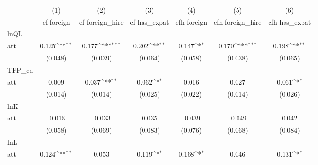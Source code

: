 {
\def\sym#1{\ifmmode^{#1}\else\(^{#1}\)\fi}
\begin{tabular}{l*{6}{c}}
\hline\hline
            &\multicolumn{1}{c}{(1)}&\multicolumn{1}{c}{(2)}&\multicolumn{1}{c}{(3)}&\multicolumn{1}{c}{(4)}&\multicolumn{1}{c}{(5)}&\multicolumn{1}{c}{(6)}\\
            &\multicolumn{1}{c}{ef foreign}&\multicolumn{1}{c}{ef foreign\_hire}&\multicolumn{1}{c}{ef has\_expat}&\multicolumn{1}{c}{efh foreign}&\multicolumn{1}{c}{efh foreign\_hire}&\multicolumn{1}{c}{efh has\_expat}\\
\hline
lnQL        &                     &                     &                     &                     &                     &                     \\
att         &       0.125\sym{**} &       0.177\sym{***}&       0.202\sym{**} &       0.147\sym{*}  &       0.170\sym{***}&       0.198\sym{**} \\
            &     (0.048)         &     (0.039)         &     (0.064)         &     (0.058)         &     (0.038)         &     (0.065)         \\
\hline
TFP\_cd      &                     &                     &                     &                     &                     &                     \\
att         &       0.009         &       0.037\sym{**} &       0.062\sym{*}  &       0.016         &       0.027         &       0.061\sym{*}  \\
            &     (0.014)         &     (0.014)         &     (0.025)         &     (0.022)         &     (0.014)         &     (0.026)         \\
\hline
lnK         &                     &                     &                     &                     &                     &                     \\
att         &      -0.018         &      -0.033         &       0.035         &      -0.039         &      -0.049         &       0.042         \\
            &     (0.058)         &     (0.069)         &     (0.083)         &     (0.076)         &     (0.068)         &     (0.084)         \\
\hline
lnL         &                     &                     &                     &                     &                     &                     \\
att         &       0.124\sym{**} &       0.053         &       0.119\sym{*}  &       0.168\sym{*}  &       0.046         &       0.131\sym{*}  \\

\end{tabular}}
